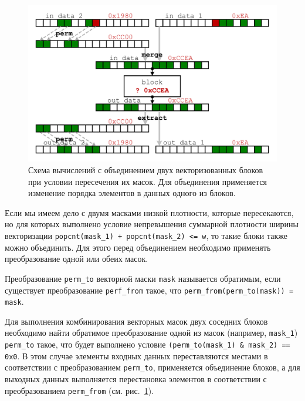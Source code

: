 \begin{figure}[ht]
\centering
\includegraphics[width=1.0\textwidth]{./fig/vec_masks_comb.pdf}
\singlespacing
{}\caption{Схема вычислений с объединением двух векторизованных блоков при условии пересечения их масок. Для объединения применяется изменение порядка элементов в данных одного из блоков.}
\label{fig:text_4_vec_comb_mask_comb_masks_perm}
\end{figure}

Если мы имеем дело с двумя масками низкой плотности, которые пересекаются, но для которых выполнено условие непревышения суммарной плотности ширины векторизации \texttt{popcnt(mask\_1) + popcnt(mask\_2) <= w}, то такие блоки также можно объединить.
Для этого перед объединением необходимо применять преобразование одной или обеих масок.

\begin{definition}
Преобразование \texttt{perm\_to} векторной маски \texttt{mask} называется обратимым, если существует преобразование \texttt{perf\_from} такое, что \texttt{perm\_from(perm\_to(mask)) = mask}.
\end{definition}

Для выполнения комбинирования векторных масок двух соседних блоков необходимо найти обратимое преобразование одной из масок (например, \texttt{mask\_1}) \texttt{perm\_to} такое, что будет выполнено условие \texttt{(perm\_to(mask\_1) \& mask\_2) == 0x0}.
В этом случае элементы входных данных переставляются местами в соответствии с преобразованием \texttt{perm\_to}, применяется объединение блоков, а для выходных данных выполняется перестановка элементов в соответствии с преобразованием \texttt{perm\_from} (см. рис.~\ref{fig:text_4_vec_comb_mask_comb_masks_perm}).

